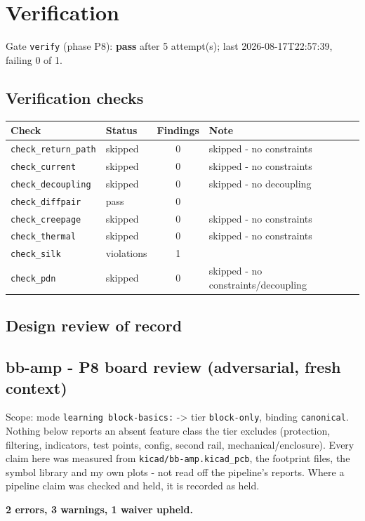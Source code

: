 \documentclass[11pt,a4paper]{article}
\begin{document}
\section{Verification}
Gate \texttt{verify} (phase P8): \textbf{pass} after 5 attempt(s); last 2026-08-17T22:57:39, failing 0 of 1.
\subsection*{Verification checks}
{\small
\begin{longtable}{llcp{6cm}}
\toprule
\textbf{Check} & \textbf{Status} & \textbf{Findings} & \textbf{Note} \\
\midrule
\endhead
\texttt{check\_return\_path} & skipped & 0 & skipped - no constraints \\
\texttt{check\_current} & skipped & 0 & skipped - no constraints \\
\texttt{check\_decoupling} & skipped & 0 & skipped - no decoupling \\
\texttt{check\_diffpair} & pass & 0 &  \\
\texttt{check\_creepage} & skipped & 0 & skipped - no constraints \\
\texttt{check\_thermal} & skipped & 0 & skipped - no constraints \\
\texttt{check\_silk} & violations & 1 &  \\
\texttt{check\_pdn} & skipped & 0 & skipped - no constraints/decoupling \\
\bottomrule
\end{longtable}
}
\subsection*{Design review of record}
\subsection*{bb-amp - P8 board review (adversarial, fresh context)}
Scope: mode \texttt{learning block-basics:} -\textgreater{} tier \texttt{block-only}, binding \texttt{canonical}. Nothing below reports an absent feature class the tier excludes (protection, filtering, indicators, test points, config, second rail, mechanical/enclosure). Every claim here was measured from \texttt{kicad/bb-amp.kicad\_pcb}, the footprint files, the symbol library and my own plots - not read off the pipeline's reports. Where a pipeline claim was checked and held, it is recorded as held.

\textbf{2 errors, 3 warnings, 1 waiver upheld.}
\end{document}
